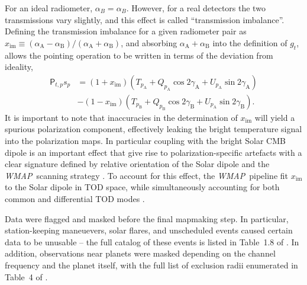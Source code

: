 \documentclass[twocolumn]{../../common/aa}
\def\WMAP{\emph{WMAP}}
\newcommand{\A}[0]{\mathrm{A}}
\newcommand{\B}[0]{\mathrm{B}}
\begin{document}
For an ideal radiometer, $\alpha_B = \alpha_B$. However, for a real detectors the two transmissions vary slightly, and this effect is called ``transmission imbalance''. Defining the transmission imbalance for a given radiometer pair as $x_\mathrm{im}\equiv(\alpha_\A-\alpha_\B)/(\alpha_\A+\alpha_\B)$, and absorbing $\alpha_\A+\alpha_\B$ into the definition of $g_t$, allows the pointing operation to be written in terms of the deviation from ideality,
\begin{align}
	\mathsf P_{t,p}s_p
	&=(1+x_\mathrm{im})(T_{p_\A}+Q_{p_\A}\cos2\gamma_\A + U_{p_\A}\sin2\gamma_\A)
	\nonumber
	\\
	&
	-(1-x_\mathrm{im})(T_{p_\B}+Q_{p_\B}\cos2\gamma_\B + U_{p_\A}\sin2\gamma_\B).
\end{align}
It is important to note that inaccuracies in the determination of $x_\mathrm{im}$ will yield a spurious polarization component, effectively leaking the bright temperature signal into the polarization maps. In particular coupling with the bright Solar CMB dipole is an important effect that give rise to polarization-specific artefacts with a clear signature defined by relative orientation of the Solar dipole and the \WMAP\ scanning strategy \citep{jarosik2007}. To account for this effect, the \WMAP\ pipeline fit $x_\mathrm{im}$ to the Solar dipole in TOD space, while simultaneously accounting for both common and differential TOD modes \citep{jarosik2003a,jarosik2007}.

Data were flagged and masked before the final mapmaking step. In particular, station-keeping maneuevers, solar flares, and unscheduled events caused certain data to be unusable -- the full catalog of these events is listed in Table~1.8 of \citet{wmapexsupp}. In addition, observations near planets were masked depending on the channel frequency and the planet itself, with the full list of exclusion radii enumerated in Table~4 of \citet{bennett2012}.
\end{document}
